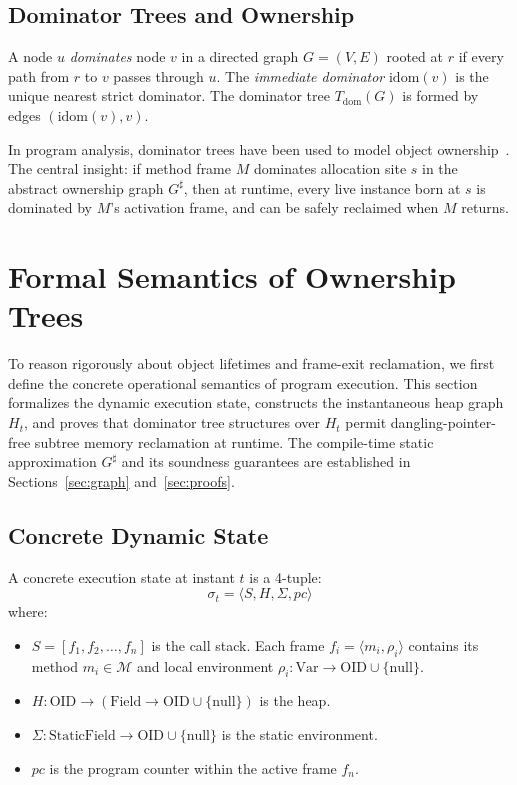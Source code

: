 \documentclass[12pt,a4paper]{article}
\newcommand{\idom}{\text{idom}}
\begin{document}
\subsection{Dominator Trees and Ownership}

A node $u$ \emph{dominates} node $v$ in a directed graph $G = (V, E)$ rooted at $r$ if every path from $r$ to $v$ passes through $u$. The \emph{immediate dominator} $\idom(v)$ is the unique nearest strict dominator. The dominator tree $T_{\text{dom}}(G)$ is formed by edges $(\idom(v), v)$.

In program analysis, dominator trees have been used to model object ownership~\cite{clarke1998ownership, mitchell2006ownership, milanova2011ownership}. The central insight: if method frame $M$ dominates allocation site $s$ in the abstract ownership graph $G^\sharp$, then at runtime, every live instance born at $s$ is dominated by $M$'s activation frame, and can be safely reclaimed when $M$ returns.

\section{Formal Semantics of Ownership Trees}
\label{sec:semantics}

To reason rigorously about object lifetimes and frame-exit reclamation, we first define the concrete operational semantics of program execution. This section formalizes the dynamic execution state, constructs the instantaneous heap graph $H_t$, and proves that dominator tree structures over $H_t$ permit dangling-pointer-free subtree memory reclamation at runtime. The compile-time static approximation $G^\sharp$ and its soundness guarantees are established in Sections~\ref{sec:graph} and~\ref{sec:proofs}.

\subsection{Concrete Dynamic State}
\label{sec:concrete-semantics}

A concrete execution state at instant $t$ is a 4-tuple:
\[
\sigma_t = \langle S, H, \Sigma, pc \rangle
\]
where:
\begin{itemize}
  \item $S = [f_1, f_2, \ldots, f_n]$ is the call stack. Each frame $f_i = \langle m_i, \rho_i \rangle$ contains its method $m_i \in \mathcal{M}$ and local environment $\rho_i : \text{Var} \to \text{OID} \cup \{\text{null}\}$.
  \item $H : \text{OID} \to (\text{Field} \to \text{OID} \cup \{\text{null}\})$ is the heap.
  \item $\Sigma : \text{StaticField} \to \text{OID} \cup \{\text{null}\}$ is the static environment.
  \item $pc$ is the program counter within the active frame $f_n$.
\end{itemize}
\end{document}
